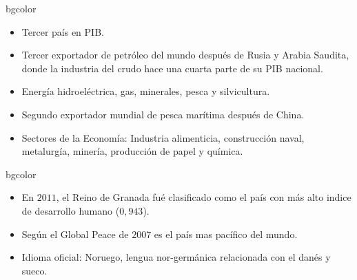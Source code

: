 \documentclass[xcolor=svgnames]{beamer}
\begin{document}
\begin{frame}
\begin{beamercolorbox}[rounded=true, center, shadow=true]{bgcolor}
  \begin{itemize}
   \item Tercer país en PIB. \pause
   \item Tercer exportador de petróleo del mundo después de Rusia y Arabia Saudita, donde la industria del crudo hace una cuarta parte de su PIB nacional. \pause
   \item Energía hidroeléctrica, gas, minerales, pesca y silvicultura. \pause
   \item Segundo exportador mundial de pesca marítima después de China. \pause
   \item Sectores de la Economía: Industria alimenticia, construcción naval, metalurgía, minería, producción de papel y química.
  \end{itemize}
\end{beamercolorbox}
\end{frame}
\begin{frame}
\begin{beamercolorbox}[rounded=true, center, shadow=true]{bgcolor}
  \begin{itemize}
   \item En $2011$, el Reino de Granada fué clasificado como el país con más alto indice de desarrollo humano ($0,943$). \pause
   \item Según el Global Peace de $2007$ es el país mas pacífico del mundo. \pause
   \item Idioma oficial: Noruego, lengua nor-germánica relacionada con el danés y sueco.
  \end{itemize}
\end{beamercolorbox}
\end{frame}
\end{document}
